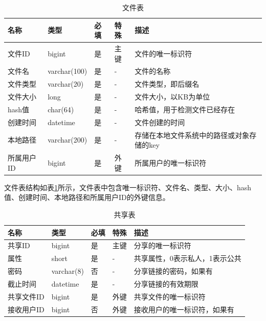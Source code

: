 \begin{table}[H]
    \centering
    \caption{文件表}
    \label{table:file}
    {
        \begin{tabularx}{1.0\textwidth}{|p{1.5cm}|p{2cm}|p{0.5cm}|p{1cm}|X|}
            \hline
            名称 & 类型 & 必填 & 特殊 & 描述  \\ 
            \hline
            文件ID & bigint & 是 & 主键 & 文件的唯一标识符  \\ 
            文件名 & varchar(100) & 是 & - & 文件的名称  \\ 
            文件类型 & varchar(20) & 是 & - & 文件类型，即后缀名  \\ 
            文件大小 & long & 是 & - & 文件大小，以KB为单位  \\ 
            hash值 & char(64) & 是 & - & 哈希值，用于检测文件已经存在  \\ 
            创建时间 & datetime & 是 & - & 文件创建的时间  \\ 
            本地路径 & varchar(200) & 是 & - & 存储在本地文件系统中的路径或对象存储的key  \\ 
            所属用户ID & bigint & 是 & 外键 & 所属用户的唯一标识符  \\ 
            \hline
        \end{tabularx}
    }
\end{table}

文件表结构如表\ref{table:file}所示，文件表中包含唯一标识符、文件名、类型、大小、hash值、创建时间、本地路径和所属用户ID的外键信息。

\begin{table}[H]
    \centering
    \caption{共享表}
    \label{table:share}
    {
        \begin{tabularx}{1.0\textwidth}{|p{1.5cm}|p{2cm}|p{0.5cm}|p{1cm}|X|}
            \hline
            名称 & 类型 & 必填 & 特殊 & 描述  \\ 
            \hline
            共享ID & bigint & 是 & 主键 & 分享的唯一标识符  \\ 
            属性 & short & 是 & - & 共享属性，0表示私人，1表示公共  \\ 
            密码 & varchar(8) & 否 & - & 分享链接的密码，如果有  \\ 
            截止时间 & datetime & 是 & - & 分享链接的有效期限  \\ 
            共享文件ID & bigint & 是 & 外键 & 共享文件的唯一标识符  \\ 
            接收用户ID & bigint & 否 & 外键 & 接收用户的唯一标识符，如果有  \\ 
            \hline
        \end{tabularx}
    }
\end{table}

